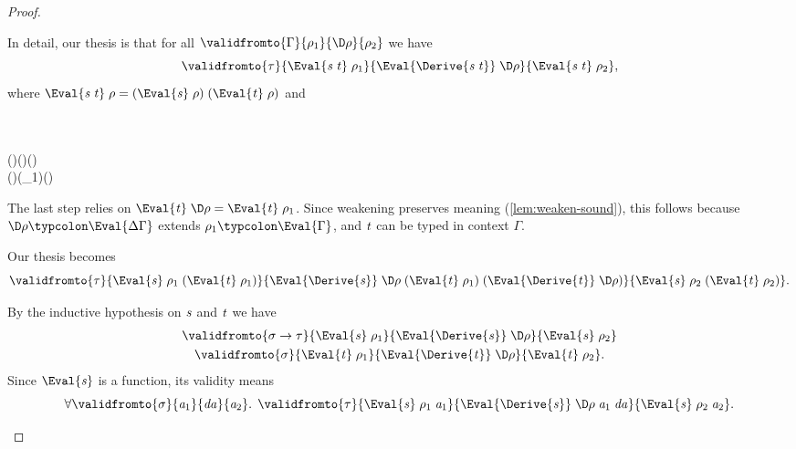 \begin{proof}
\begin{itemize}
    In detail, our thesis is that for all \ensuremath{\validfromto{\Gamma}{\rho_{1}}{\D\rho}{\rho_{2}}} we have
    \[\ensuremath{\validfromto{\tau}{\Eval{\Varid{s}\;\Varid{t}}\;\rho_{1}}{\Eval{\Derive{\Varid{s}\;\Varid{t}}}\;\D\rho}{\Eval{\Varid{s}\;\Varid{t}}\;\rho_{2}}},\]
    where \ensuremath{\Eval{\Varid{s}\;\Varid{t}}\;\rho\mathrel{=}(\Eval{\Varid{s}}\;\rho)\;(\Eval{\Varid{t}}\;\rho)} and
    \begin{equational}
      \begin{hscode}\SaveRestoreHook
{}%
%
%
%
\>[4]{}\;\D\rho{}\<[E]%
\\
\>[B]{}\mathrel{=}{}\<[BE]%
\>[4]{}\;\D\rho{}\<[E]%
\\
\>[B]{}\mathrel{=}{}\<[BE]%
\>[4]{}(\;\D\rho)\;(\;\D\rho)\;(\;\D\rho){}\<[E]%
\\
\>[B]{}\mathrel{=}{}\<[BE]%
\>[4]{}(\;\D\rho)\;(\;\rho_{1})\;(\;\D\rho){}\<[E]%
\ColumnHook
\end{hscode}\resethooks
%
    \end{equational}%
    The last step relies on \ensuremath{\Eval{\Varid{t}}\;\D\rho\mathrel{=}\Eval{\Varid{t}}\;\rho_{1}}. Since
    weakening preserves meaning (\cref{lem:weaken-sound}), this
    follows because \ensuremath{\D\rho\typcolon\Eval{\Delta \Gamma}} extends \ensuremath{\rho_{1}\typcolon\Eval{\Gamma}}, and \ensuremath{\Varid{t}} can be typed in context \ensuremath{\Gamma}.

    Our thesis becomes
    \[\ensuremath{\validfromto{\tau}{\Eval{\Varid{s}}\;\rho_{1}\;(\Eval{\Varid{t}}\;\rho_{1})}{\Eval{\Derive{\Varid{s}}}\;\D\rho\;(\Eval{\Varid{t}}\;\rho_{1})\;(\Eval{\Derive{\Varid{t}}}\;\D\rho)}{\Eval{\Varid{s}}\;\rho_{2}\;(\Eval{\Varid{t}}\;\rho_{2})}}.\]

    By the inductive
    hypothesis on \ensuremath{\Varid{s}} and \ensuremath{\Varid{t}} we have
    \begin{gather*}
      \ensuremath{\validfromto{\sigma\to \tau}{\Eval{\Varid{s}}\;\rho_{1}}{\Eval{\Derive{\Varid{s}}}\;\D\rho}{\Eval{\Varid{s}}\;\rho_{2}}} \\
      \ensuremath{\validfromto{\sigma}{\Eval{\Varid{t}}\;\rho_{1}}{\Eval{\Derive{\Varid{t}}}\;\D\rho}{\Eval{\Varid{t}}\;\rho_{2}}}.
    \end{gather*}
    Since \ensuremath{\Eval{\Varid{s}}} is a function, its validity
    means
    \[\ensuremath{\forall \validfromto{\sigma}{\Varid{a}_{1}}{\Varid{da}}{\Varid{a}_{2}}\hsforall \hsdot{\circ }{\mathpunct{.}}\;\validfromto{\tau}{\Eval{\Varid{s}}\;\rho_{1}\;\Varid{a}_{1}}{\Eval{\Derive{\Varid{s}}}\;\D\rho\;\Varid{a}_{1}\;\Varid{da}}{\Eval{\Varid{s}}\;\rho_{2}\;\Varid{a}_{2}}}.\]


\end{itemize}
\end{proof}
